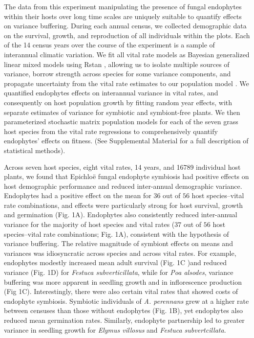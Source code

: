 \documentclass[12pt]{article}
\begin{document}
The data from this experiment manipulating the presence of fungal endophytes within their hosts over long time scales are uniquely suitable to quantify effects on variance buffering. 
During each annual census, we collected demographic data on the survival, growth, and reproduction of all individuals within the plots. 
Each of the 14 census years over the course of the experiment is a sample of interannual climatic variation.
We fit all vital rate models as Bayesian generalized linear mixed models using Rstan \cite{rstan2022}, allowing us to isolate multiple sources of variance, borrow strength across species for some variance components, and propagate uncertainty from the vital rate estimates to our population model \cite{elderd2016quantifying}. 
We quantified endophytes effects on interannual variance in vital rates, and consequently on host population growth by fitting random year effects, with separate estimates of variance for symbiotic and symbiont-free plants.
We then parameterized stochastic matrix population models for each of the seven grass host species from the vital rate regressions to comprehensively quantify endophytes' effects on fitness. (See Supplemental Material for a full description of statistical methods).

Across seven host species, eight vital rates, 14 years, and 16789 individual host plants, we found that Epichlo\"{e} fungal endophyte symbiosis had positive effects on host demographic performance and reduced inter-annual demographic variance. 
Endophytes had a positive effect on the mean for $36$ out of $56$ host species--vital rate combinations, and effects were particularly strong for host survival, growth and germination (Fig. 1A).
Endophytes also consistently reduced inter-annual variance for the majority of host species and vital rates ($37$ out of $56$ host species--vital rate combinations; Fig. 1A), consistent with the hypothesis of variance buffering. 
The relative magnitude of symbiont effects on means and variances was idiosyncratic across species and across vital rates.
For example, endophytes modestly increased mean adult survival (Fig. 1C )and reduced variance (Fig. 1D) for \emph{Festuca subverticillata}, while for \emph{Poa alsodes}, variance buffering was more apparent in seedling growth and in inflorescence production (Fig 1C). 
Interestingly, there were also certain vital rates that showed costs of endophyte symbiosis. 
Symbiotic individuals of \emph{A. perennans} grew at a higher rate between censuses than those without endophytes (Fig. 1B), yet endophytes also reduced mean germination rates. 
Similarly, endophyte partnership led to greater variance in seedling growth for \emph{Elymus villosus} and \emph{Festuca subvertcillata}.
 
\end{document}

